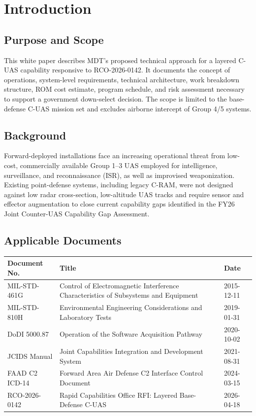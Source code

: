 \section{Introduction}

\subsection{Purpose and Scope}
This white paper describes MDT's proposed technical approach for a layered C-UAS capability responsive to RCO-2026-0142. It documents the concept of operations, system-level requirements, technical architecture, work breakdown structure, ROM cost estimate, program schedule, and risk assessment necessary to support a government down-select decision. The scope is limited to the base-defense C-UAS mission set and excludes airborne intercept of Group 4/5 systems.

\subsection{Background}
Forward-deployed installations face an increasing operational threat from low-cost, commercially available Group 1--3 UAS employed for intelligence, surveillance, and reconnaissance (ISR), as well as improvised weaponization. Existing point-defense systems, including legacy C-RAM, were not designed against low radar cross-section, low-altitude UAS tracks and require sensor and effector augmentation to close current capability gaps identified in the FY26 Joint Counter-UAS Capability Gap Assessment.

\subsection{Applicable Documents}
\begin{tabularx}{\linewidth}{@{}l >{\raggedright\arraybackslash}X l@{}}
\toprule
\rowcolor{accentlight}
\textbf{Document No.} & \textbf{Title} & \textbf{Date} \\
\midrule
MIL-STD-461G & Control of Electromagnetic Interference Characteristics of Subsystems and Equipment & 2015-12-11 \\
MIL-STD-810H & Environmental Engineering Considerations and Laboratory Tests & 2019-01-31 \\
DoDI 5000.87 & Operation of the Software Acquisition Pathway & 2020-10-02 \\
JCIDS Manual & Joint Capabilities Integration and Development System & 2021-08-31 \\
FAAD C2 ICD-14 & Forward Area Air Defense C2 Interface Control Document & 2024-03-15 \\
RCO-2026-0142 & Rapid Capabilities Office RFI: Layered Base-Defense C-UAS & 2026-04-18 \\
\bottomrule
\end{tabularx}

\clearpage

